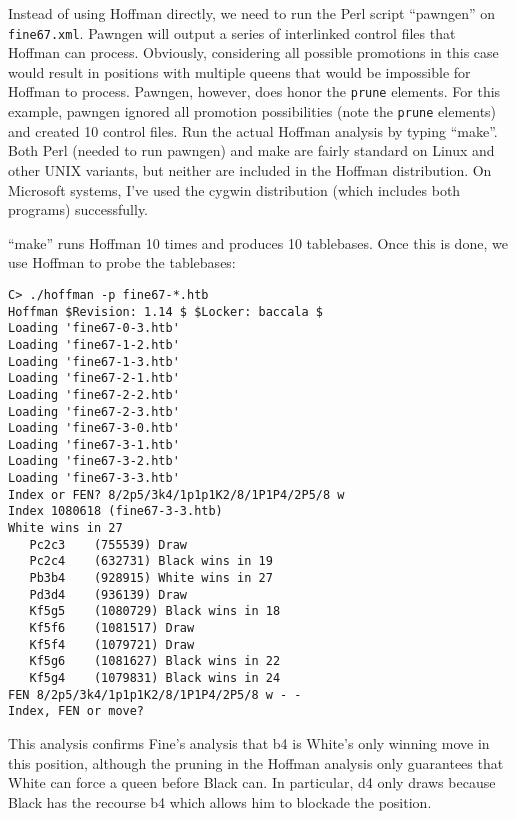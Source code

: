 \documentclass[11pt]{article}
\begin{document}
Instead of using Hoffman directly, we need to run the Perl script ``pawngen'' on
{\tt fine67.xml}.  Pawngen will
output a series of interlinked control files that Hoffman can process.
Obviously, considering all possible promotions in this case would
result in positions with multiple queens that would be impossible for
Hoffman to process.  Pawngen, however, does honor the {\tt prune}
elements.  For this example, pawngen ignored all promotion
possibilities (note the {\tt prune} elements) and created 10 control
files.  Run the actual Hoffman analysis by typing ``make''.
Both Perl (needed to run pawngen) and make are fairly standard on
Linux and other UNIX variants, but neither are included in the Hoffman
distribution.  On Microsoft systems, I've used the cygwin distribution
(which includes both programs) successfully.

``make'' runs Hoffman 10 times and produces 10
tablebases.  Once this is done, we use Hoffman to probe the tablebases:

\begin{verbatim}
C> ./hoffman -p fine67-*.htb
Hoffman $Revision: 1.14 $ $Locker: baccala $
Loading 'fine67-0-3.htb'
Loading 'fine67-1-2.htb'
Loading 'fine67-1-3.htb'
Loading 'fine67-2-1.htb'
Loading 'fine67-2-2.htb'
Loading 'fine67-2-3.htb'
Loading 'fine67-3-0.htb'
Loading 'fine67-3-1.htb'
Loading 'fine67-3-2.htb'
Loading 'fine67-3-3.htb'
Index or FEN? 8/2p5/3k4/1p1p1K2/8/1P1P4/2P5/8 w
Index 1080618 (fine67-3-3.htb)
White wins in 27
   Pc2c3    (755539) Draw
   Pc2c4    (632731) Black wins in 19
   Pb3b4    (928915) White wins in 27
   Pd3d4    (936139) Draw
   Kf5g5    (1080729) Black wins in 18
   Kf5f6    (1081517) Draw
   Kf5f4    (1079721) Draw
   Kf5g6    (1081627) Black wins in 22
   Kf5g4    (1079831) Black wins in 24
FEN 8/2p5/3k4/1p1p1K2/8/1P1P4/2P5/8 w - -
Index, FEN or move? 
\end{verbatim}

This analysis confirms Fine's analysis that b4 is White's only winning
move in this position, although the pruning in the Hoffman analysis
only guarantees that White can force a queen before Black can.  In
particular, d4 only draws because Black has the recourse b4 which
allows him to blockade the position.
\end{document}
